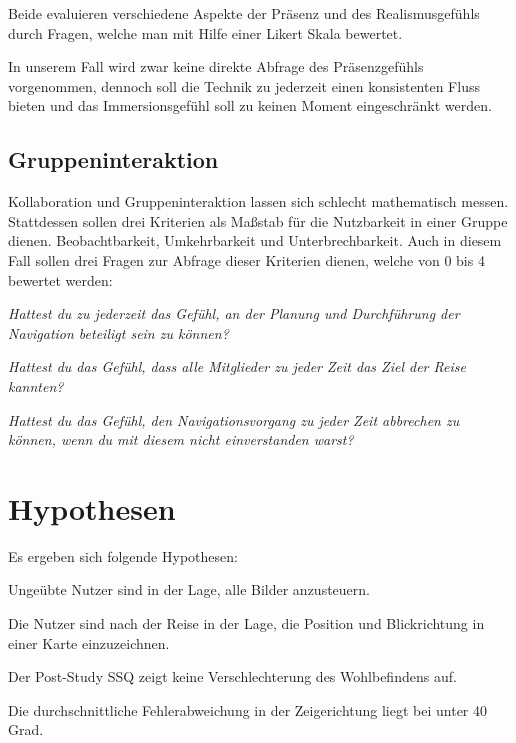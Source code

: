 Beide evaluieren verschiedene Aspekte der Präsenz und des Realismusgefühls durch Fragen, welche man mit Hilfe einer Likert Skala bewertet.

In unserem Fall wird zwar keine direkte Abfrage des Präsenzgefühls vorgenommen, dennoch soll die Technik zu jederzeit einen konsistenten Fluss bieten und das Immersionsgefühl soll zu keinen Moment eingeschränkt werden.

\subsection{Gruppeninteraktion}
Kollaboration und Gruppeninteraktion lassen sich schlecht mathematisch messen. 
Stattdessen sollen drei Kriterien als Maßstab für die Nutzbarkeit in einer Gruppe dienen.
Beobachtbarkeit, Umkehrbarkeit und Unterbrechbarkeit.
Auch in diesem Fall sollen drei Fragen zur Abfrage dieser Kriterien dienen, welche von 0 bis 4 bewertet werden:

\textit{Hattest du zu jederzeit das Gefühl, an der Planung und Durchführung der Navigation beteiligt sein zu können?}

\textit{Hattest du das Gefühl, dass alle Mitglieder zu jeder Zeit das Ziel der Reise kannten?}

\textit{Hattest du das Gefühl, den Navigationsvorgang zu jeder Zeit abbrechen zu können, wenn du mit diesem nicht einverstanden warst?}

\section{Hypothesen}
Es ergeben sich folgende Hypothesen:

\begin{hypothesis}
\label{hyp:test}
Ungeübte Nutzer sind in der Lage, alle Bilder anzusteuern. 
\end{hypothesis}

\begin{hypothesis}
\label{hyp:test}
Die Nutzer sind nach der Reise in der Lage, die Position und Blickrichtung in einer Karte einzuzeichnen.
\end{hypothesis}

\begin{hypothesis}
\label{hyp:test}
Der Post-Study SSQ zeigt keine Verschlechterung des Wohlbefindens auf.
\end{hypothesis}

\begin{hypothesis}
\label{hyp:test}
Die durchschnittliche Fehlerabweichung  in der Zeigerichtung liegt bei unter 40 Grad.
\end{hypothesis}

